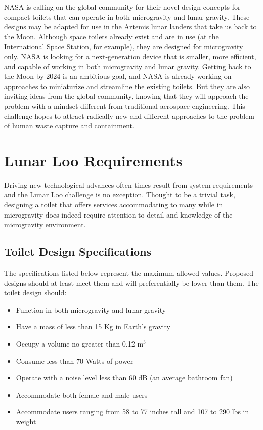 NASA is calling on the global community for their novel design concepts for compact toilets that can operate in both microgravity and lunar gravity.  These designs may be adapted for use in the Artemis lunar landers that take us back to the Moon.  Although space toilets already exist and are in use (at the International Space Station, for example), they are designed for microgravity only.  NASA is looking for a next-generation device that is smaller, more efficient, and capable of working in both microgravity and lunar gravity.  Getting back to the Moon by 2024 is an ambitious goal, and NASA is already working on approaches to miniaturize and streamline the existing toilets.  But they are also inviting ideas from the global community, knowing that they will approach the problem with a mindset different from traditional aerospace engineering.  This challenge hopes to attract radically new and different approaches to the problem of human waste capture and containment.

\pagebreak
\section{Lunar Loo Requirements}
Driving new technological advances often times result from system requirements and the Lunar Loo challenge is no exception. Thought to be a trivial task, designing a toilet that offers services accommodating to many while in microgravity does indeed require attention to detail and knowledge of the microgravity environment.

    \subsection{Toilet Design Specifications}

    The specifications listed below represent the maximum allowed values.  Proposed designs should at least meet them and will preferentially be lower than them.  The toilet design should:

    \begin{itemize}
        \item Function in both microgravity and lunar gravity
        \item Have a mass of less than 15 Kg in Earth’s gravity
        \item Occupy a volume no greater than 0.12 $\text{m}^3$
        \item Consume less than 70 Watts of power
        \item Operate with a noise level less than 60 dB (an average bathroom fan)
        \item Accommodate both female and male users
        \item Accommodate users ranging from 58 to 77 inches tall and 107 to 290 lbs in weight
    \end{itemize}
    
